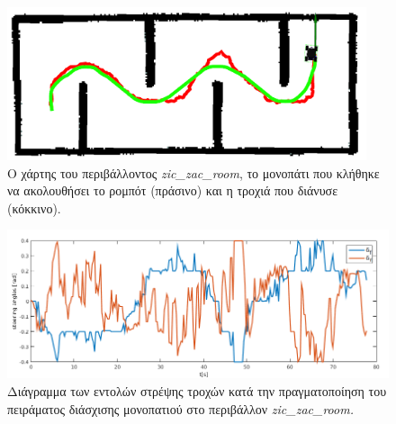 \begin{figure}[!ht]
	\centering
	\includegraphics[height=4.5cm]{Chapters/Chapter5/Figures/ptc_experiments/zic_zac_room_path_and_traj.png}
	\caption{Ο χάρτης του περιβάλλοντος \textit{zic{\_}zac{\_}room}, το μονοπάτι που κλήθηκε να ακολουθήσει το ρομπότ (πράσινο) και η τροχιά που διάνυσε (κόκκινο).}
	\label{fig:zic_zac_room_path_and_traj}
\end{figure}

\begin{figure}[!ht]
	\centering
	\includegraphics[width=0.9\linewidth]{Chapters/Chapter5/Figures/ptc_experiments/plots/zic_zac_room/fsa_rsa.png}
	\caption{Διάγραμμα των εντολών στρέψης τροχών κατά την πραγματοποίηση του πειράματος διάσχισης μονοπατιού στο περιβάλλον \textit{zic{\_}zac{\_}room.}}
	\label{fig:zic_zac_room_fsa_rsa}
\end{figure}

